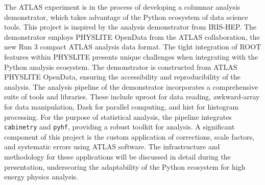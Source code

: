 The ATLAS experiment is in the process of developing a columnar analysis demonstrator, which takes advantage of the Python ecosystem of data science tools.
This project is inspired by the analysis demonstrator from IRIS-HEP.
The demonstrator employs PHYSLITE OpenData from the ATLAS collaboration, the new Run 3 compact ATLAS analysis data format.
The tight integration of ROOT features within PHYSLITE presents unique challenges when integrating with the Python analysis ecosystem.
The demonstrator is constructed from ATLAS PHYSLITE OpenData, ensuring the accessibility and reproducibility of the analysis.
The analysis pipeline of the demonstrator incorporates a comprehensive suite of tools and libraries.
These include uproot for data reading, awkward-array for data manipulation, Dask for parallel computing, and hist for histogram processing.
For the purpose of statistical analysis, the pipeline integrates \texttt{cabinetry} and \texttt{pyhf}, providing a robust toolkit for analysis.
A significant component of this project is the custom application of corrections, scale factors, and systematic errors using ATLAS software.
The infrastructure and methodology for these applications will be discussed in detail during the presentation, underscoring the adaptability of the Python ecosystem for high energy physics analysis.
